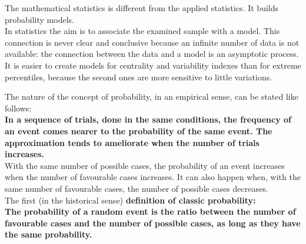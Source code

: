 
\begin{frame}
  \vspace*{.5cm}
  The mathematical statistics is different from the applied statistics. It builds probability models.\\
  \vspace*{.5cm}
  In statistics the aim is to associate the examined sample with a model. This connection is never clear and conclusive because an infinite number of data is not available: the connection between the data and a model is an asymptotic process.\\
  \vspace*{.5cm}
  It is easier to create models for centrality and variability indexes than for extreme percentiles, because the second ones are more sensitive to little variations.
\end{frame}

\begin{frame}
  The nature of the concept of probability, in an empirical sense, can be stated like follows: \\
  \textbf{In a sequence of trials, done in the same conditions, the frequency of an event comes nearer to the probability of the same event. The approximation tends to ameliorate when the number of trials increases.}\\
  \vspace*{.2cm}
  With the same number of possible cases, the probability of an event increases when the number of favourable cases increases. It can also happen when, with the same number of favourable cases, the number of possible cases decreases. \\
  \vspace*{.2cm}
  The first (in the historical sense) \textbf{definition of classic probability:}\\
  \textbf{The probability of a random event is the ratio between the number of favourable cases and the number of possible cases, as long as they have the same probability.}\\
\end{frame}

